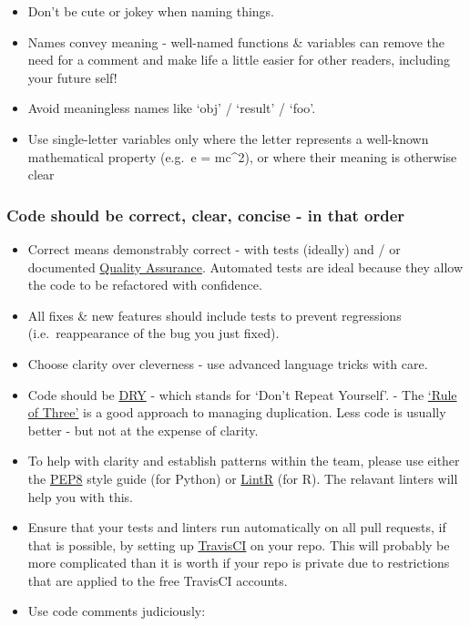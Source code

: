 \documentclass[]{book}
\providecommand{\tightlist}{%
  \setlength{\itemsep}{0pt}\setlength{\parskip}{0pt}}
\begin{document}
\begin{itemize}
\tightlist
\item
  Don't be cute or jokey when naming things.
\item
  Names convey meaning - well-named functions \& variables can remove the need for a comment and make life a little easier for other readers, including your future self!
\item
  Avoid meaningless names like `obj' / `result' / `foo'.
\item
  Use single-letter variables only where the letter represents a well-known mathematical property (e.g.~e = mc\^{}2), or where their meaning is otherwise clear
\end{itemize}

\hypertarget{ccc}{%
\subsubsection{Code should be correct, clear, concise - in that order}\label{ccc}}

\begin{itemize}
\tightlist
\item
  Correct means demonstrably correct - with tests (ideally) and / or documented \href{quality_assurance.md}{Quality Assurance}. Automated tests are ideal because they allow the code to be refactored with confidence.
\item
  All fixes \& new features should include tests to prevent regressions (i.e.~reappearance of the bug you just fixed).
\item
  Choose clarity over cleverness - use advanced language tricks with care.
\item
  Code should be \href{https://en.wikipedia.org/wiki/Don\%27t_repeat_yourself}{DRY} - which stands for `Don't Repeat Yourself'. - The \href{https://en.wikipedia.org/wiki/Rule_of_three_(computer_programming)}{`Rule of Three'} is a good approach to managing duplication. Less code is usually better - but not at the expense of clarity.\\
\item
  To help with clarity and establish patterns within the team, please use either the \href{https://pypi.python.org/pypi/pep8}{PEP8} style guide (for Python) or \href{https://github.com/jimhester/lintr}{LintR} (for R). The relavant linters will help you with this.
\item
  Ensure that your tests and linters run automatically on all pull requests, if that is possible, by setting up \href{https://travis-ci.org/}{TravisCI} on your repo. This will probably be more complicated than it is worth if your repo is private due to restrictions that are applied to the free TravisCI accounts.
\item
  Use code comments judiciously:
\end{itemize}
\end{document}

